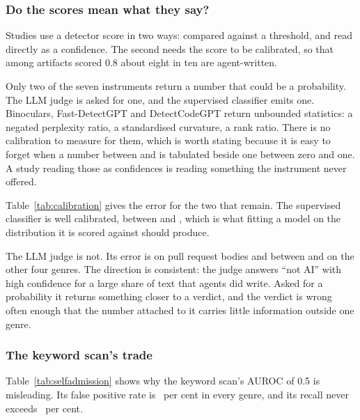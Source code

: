 \subsubsection{Do the scores mean what they say?}
\label{sec:validity:rq1:calibration}

Studies use a detector score in two ways: compared against a threshold, and read
directly as a confidence. The second needs the score to be calibrated, so that among
artifacts scored 0.8 about eight in ten are agent-written.

Only two of the seven instruments return a number that could be a probability. The LLM
judge is asked for one, and the supervised classifier emits one. Binoculars,
Fast-DetectGPT and DetectCodeGPT return unbounded statistics: a negated perplexity
ratio, a standardised curvature, a rank ratio. There is no calibration to measure for
them, which is worth stating because it is easy to forget when a number between
 and  is tabulated beside one between zero and one. A study
reading those as confidences is reading something the instrument never offered.



Table~\ref{tab:calibration} gives the error for the two that remain. The supervised
classifier is well calibrated, between  and , which is
what fitting a model on the distribution it is scored against should produce.

The LLM judge is not. Its error is  on pull request bodies and between
 and  on the other four genres. The direction is
consistent: the judge answers ``not AI'' with high confidence for a large share of text
that agents did write. Asked for a probability it returns something closer to a verdict,
and the verdict is wrong often enough that the number attached to it carries little
information outside one genre.

\subsubsection{The keyword scan's trade}
\label{sec:validity:rq1:trade}



Table~\ref{tab:selfadmission} shows why the keyword scan's AUROC of 0.5 is misleading.
Its false positive rate is \SelfAdmissionFprMax{}~per cent in every genre, and its
recall never exceeds \SelfAdmissionRecallMax{}~per cent.

